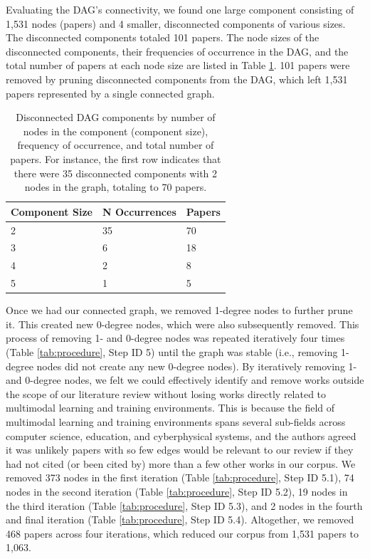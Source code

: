 \documentclass[manuscript,screen,review]{acmart}
\begin{document}
Evaluating the DAG's connectivity, we found one large component consisting of 1,531 nodes (papers) and 4 smaller, disconnected components of various sizes. The disconnected components totaled 101 papers. The node sizes of the disconnected components, their frequencies of occurrence in the DAG, and the total number of papers at each node size are listed in Table \ref{tab:disconnected}. 101 papers were removed by pruning disconnected components from the DAG, which left 1,531 papers represented by a single connected graph. 

\begin{table}[htbp]
    \renewcommand{\arraystretch}{1.3}%
    \centering
    \caption{Disconnected DAG components by number of nodes in the component (component size), frequency of occurrence, and total number of papers. For instance, the first row indicates that there were 35 disconnected components with 2 nodes in the graph, totaling to 70 papers.}
    \begin{tabularx}{0.5\linewidth}{l@{\hskip .25in} l@{\hskip .25in} l@{\hskip .25in}}
        Component Size & N Occurrences & Papers \\
        \midrule
        
        2    &  35 &  70\\
        \midrule
        
        3    &  6  &  18\\
        \midrule
        
        4    &  2  &  8\\
        \midrule
        
        5    &  1  &  5\\

        \bottomrule
    \end{tabularx}
    \label{tab:disconnected}
\end{table}

Once we had our connected graph, we removed 1-degree nodes to further prune it. This created new 0-degree nodes, which were also subsequently removed. This process of removing 1- and 0-degree nodes was repeated iteratively four times (Table \ref{tab:procedure}, Step ID 5) until the graph was stable (i.e., removing 1-degree nodes did not create any new 0-degree nodes). By iteratively removing 1- and 0-degree nodes, we felt we could effectively identify and remove works outside the scope of our literature review without losing works directly related to multimodal learning and training environments. This is because the field of multimodal learning and training environments spans several sub-fields across computer science, education, and cyberphysical systems, and the authors agreed it was unlikely papers with so few edges would be relevant to our review if they had not cited (or been cited by) more than a few other works in our corpus. We removed 373 nodes in the first iteration (Table \ref{tab:procedure}, Step ID 5.1), 74 nodes in the second iteration (Table \ref{tab:procedure}, Step ID 5.2), 19 nodes in the third iteration (Table \ref{tab:procedure}, Step ID 5.3), and 2 nodes in the fourth and final iteration (Table \ref{tab:procedure}, Step ID 5.4). Altogether, we removed 468 papers across four iterations, which reduced our corpus from 1,531 papers to 1,063. 
\end{document}
